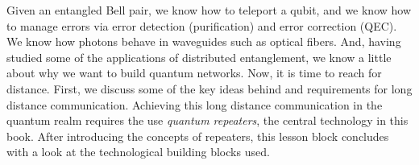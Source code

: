 
\begin{partintro}
Given an entangled Bell pair, we know how to teleport a qubit, and we know how to manage errors via error detection (purification) and error correction (QEC).  We know how photons behave in waveguides such as optical fibers.  And, having studied some of the applications of distributed entanglement, we know a little about why we want to build quantum networks.
Now, it is time to reach for distance. First, we discuss some of the key ideas behind and requirements for long distance communication.  Achieving this long distance communication in the quantum realm requires the use \emph{quantum repeaters}, the central technology in this book. After introducing the concepts of repeaters, this lesson block concludes with a look at the technological building blocks used.
\end{partintro}
